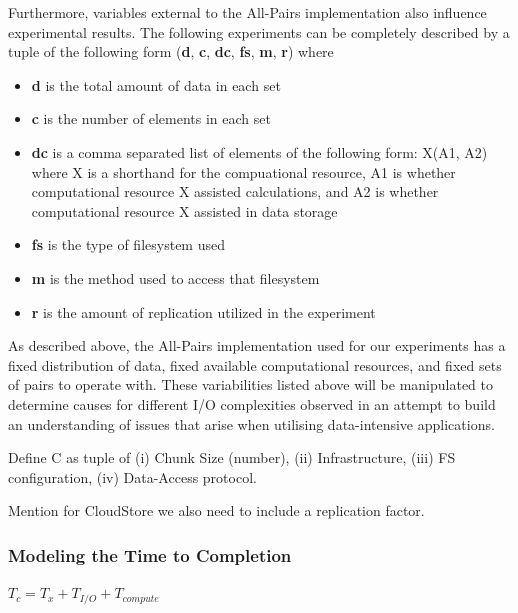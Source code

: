 \documentclass{rspublic}
\begin{document}
Furthermore, variables external to the All-Pairs implementation also
influence experimental results. The following experiments can be
completely described by a tuple of the following form (\textbf{d},
\textbf{c}, \textbf{dc}, \textbf{fs}, \textbf{m}, \textbf{r}) where

\begin{itemize} 
\item \textbf{d} is the total amount of data in each set
\item \textbf{c} is the number of elements in each set
\item \textbf{dc} is a comma separated list of elements of the following
form: X(A1, A2) where X is a shorthand for the compuational resource, A1
is whether computational resource X assisted calculations, and A2 is
whether computational resource X assisted in data storage
\item \textbf{fs} is the type of filesystem used
\item \textbf{m} is the method used to access that filesystem
\item \textbf{r} is the amount of replication utilized in the experiment
\end{itemize}

As described above, the All-Pairs implementation used for our
experiments has a fixed distribution of data, fixed available
computational resources, and fixed sets of pairs to operate with.
These variabilities listed above will be manipulated to determine causes
for different I/O complexities observed in an attempt to build an
understanding of issues that arise when utilising data-intensive
applications.

Define C as  tuple of (i) Chunk Size (number), (ii) Infrastructure,
(iii) FS configuration, (iv) Data-Access protocol.

Mention for CloudStore we also need to include a replication factor.

\subsubsection{Modeling the Time to Completion}

$T_c = T_x + T_{I/O} + T_{compute}$
\end{document}
